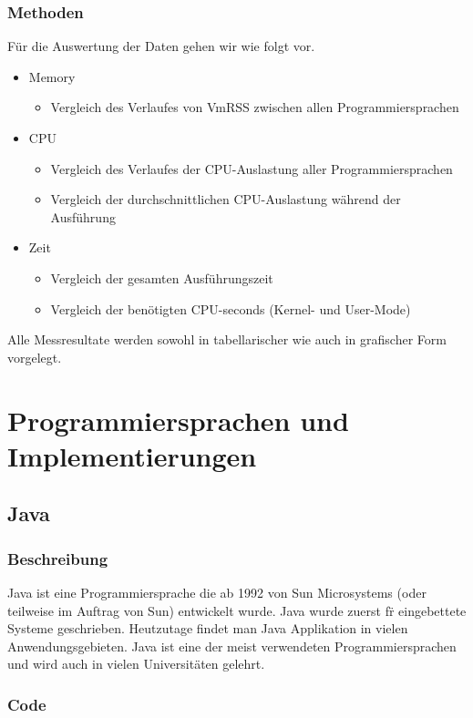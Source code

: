 \documentclass{fancydocument}
\begin{document}
\subsubsection{Methoden}
Für die Auswertung der Daten gehen wir wie folgt vor.
\begin{itemize}
\item Memory
\begin{itemize}
\item Vergleich des Verlaufes von VmRSS zwischen allen Programmiersprachen
\end{itemize}
\item CPU
\begin{itemize}
\item Vergleich des Verlaufes der CPU-Auslastung aller Programmiersprachen
\item Vergleich der durchschnittlichen CPU-Auslastung während der Ausführung
\end{itemize}
\item Zeit
\begin{itemize}
\item Vergleich der gesamten Ausführungszeit
\item Vergleich der benötigten CPU-seconds (Kernel- und User-Mode)
\end{itemize}
\end{itemize}
Alle Messresultate werden sowohl in tabellarischer wie auch in grafischer Form vorgelegt.
\section{Programmiersprachen und Implementierungen}

\subsection{Java}
\subsubsection{Beschreibung}

Java ist eine Programmiersprache die ab 1992 von Sun Microsystems (oder
teilweise im Auftrag von Sun) entwickelt wurde. Java wurde zuerst f\"r
eingebettete Systeme geschrieben. Heutzutage findet man Java Applikation in
vielen Anwendungsgebieten.
Java ist eine der meist verwendeten Programmiersprachen und wird auch
in vielen Universitäten gelehrt. 

\subsubsection{Code}
\end{document}
